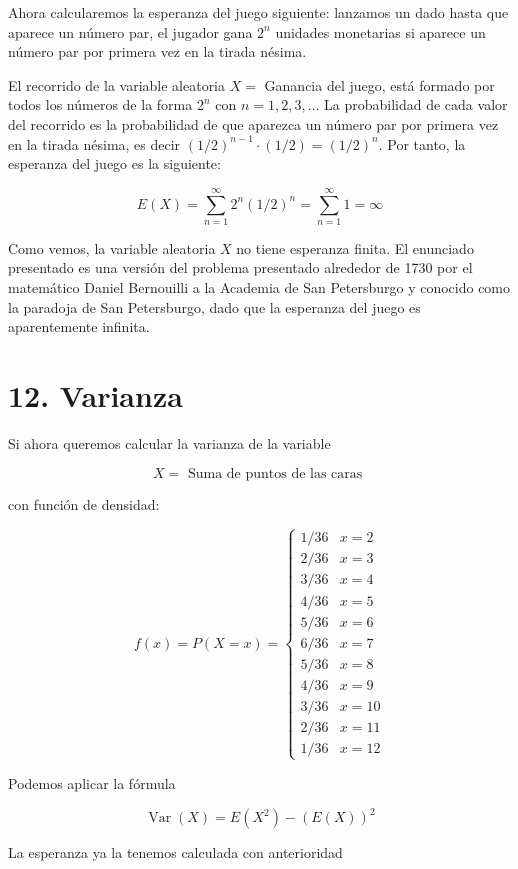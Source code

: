 \documentclass[
  a4paper,
  DIV=11,
  numbers=noendperiod]{scrreprt}
\begin{document}
Ahora calcularemos la esperanza del juego siguiente: lanzamos un dado
hasta que aparece un número par, el jugador gana \(2^{n}\) unidades
monetarias si aparece un número par por primera vez en la tirada nésima.

El recorrido de la variable aleatoria \(X=\) Ganancia del juego, está
formado por todos los números de la forma \(2^{n}\) con
\(n=1,2,3, \ldots\) La probabilidad de cada valor del recorrido es la
probabilidad de que aparezca un número par por primera vez en la tirada
nésima, es decir \((1 / 2)^{n-1} \cdot(1 / 2)=(1 / 2)^{n}\). Por tanto,
la esperanza del juego es la siguiente:

\[
E(X)=\sum_{n=1}^{\infty} 2^{n}(1 / 2)^{n}=\sum_{n=1}^{\infty} 1=\infty
\]

Como vemos, la variable aleatoria \(X\) no tiene esperanza finita. El
enunciado presentado es una versión del problema presentado alrededor de
1730 por el matemático Daniel Bernouilli a la Academia de San
Petersburgo y conocido como la paradoja de San Petersburgo, dado que la
esperanza del juego es aparentemente infinita.

\section{12. Varianza}\label{varianza}

Si ahora queremos calcular la varianza de la variable

\[
X=\text { Suma de puntos de las caras }
\]

con función de densidad:

\[
f(x)=P(X=x)= \begin{cases}1 / 36 & x=2 \\ 2 / 36 & x=3 \\ 3 / 36 & x=4 \\ 4 / 36 & x=5 \\ 5 / 36 & x=6 \\ 6 / 36 & x=7 \\ 5 / 36 & x=8 \\ 4 / 36 & x=9 \\ 3 / 36 & x=10 \\ 2 / 36 & x=11 \\ 1 / 36 & x=12\end{cases}
\]

Podemos aplicar la fórmula

\[
\operatorname{Var}(X)=E\left(X^{2}\right)-(E(X))^{2}
\]

La esperanza ya la tenemos calculada con anterioridad
\end{document}
